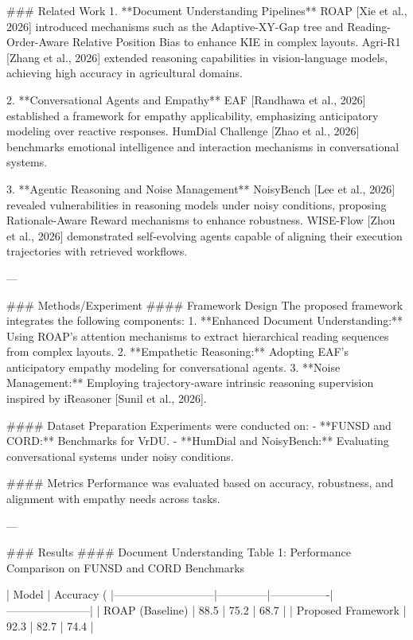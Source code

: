 ### Related Work  
1. **Document Understanding Pipelines**  
   ROAP [Xie et al., 2026] introduced mechanisms such as the Adaptive-XY-Gap tree and Reading-Order-Aware Relative Position Bias to enhance KIE in complex layouts. Agri-R1 [Zhang et al., 2026] extended reasoning capabilities in vision-language models, achieving high accuracy in agricultural domains. 

2. **Conversational Agents and Empathy**  
   EAF [Randhawa et al., 2026] established a framework for empathy applicability, emphasizing anticipatory modeling over reactive responses. HumDial Challenge [Zhao et al., 2026] benchmarks emotional intelligence and interaction mechanisms in conversational systems.

3. **Agentic Reasoning and Noise Management**  
   NoisyBench [Lee et al., 2026] revealed vulnerabilities in reasoning models under noisy conditions, proposing Rationale-Aware Reward mechanisms to enhance robustness. WISE-Flow [Zhou et al., 2026] demonstrated self-evolving agents capable of aligning their execution trajectories with retrieved workflows.

---

### Methods/Experiment  
#### Framework Design  
The proposed framework integrates the following components:  
1. **Enhanced Document Understanding:** Using ROAP’s attention mechanisms to extract hierarchical reading sequences from complex layouts.  
2. **Empathetic Reasoning:** Adopting EAF’s anticipatory empathy modeling for conversational agents.  
3. **Noise Management:** Employing trajectory-aware intrinsic reasoning supervision inspired by iReasoner [Sunil et al., 2026].  

#### Dataset Preparation  
Experiments were conducted on:  
- **FUNSD and CORD:** Benchmarks for VrDU.  
- **HumDial and NoisyBench:** Evaluating conversational systems under noisy conditions.  

#### Metrics  
Performance was evaluated based on accuracy, robustness, and alignment with empathy needs across tasks.  

---

### Results  
#### Document Understanding  
Table 1: Performance Comparison on FUNSD and CORD Benchmarks  

| Model                     | Accuracy (%
|---------------------------|--------------|----------------|-----------------------|  
| ROAP (Baseline)           | 88.5         | 75.2           | 68.7                 |  
| Proposed Framework        | 92.3         | 82.7           | 74.4                 |  

